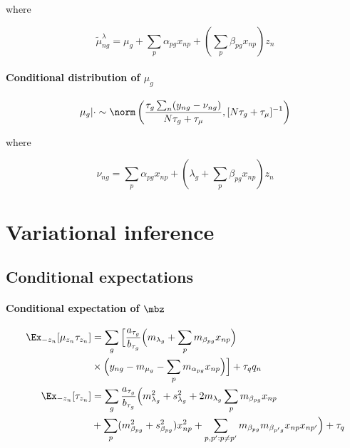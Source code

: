 where

\begin{equation}
\tilde{\mu}^\lambda_{ng} = \mu_g + \sum_p \alpha_{pg} x_{np} + \left( \sum_p \beta_{pg} x_{np} \right) z_n
\end{equation}

\paragraph{Conditional distribution of $\mu_g$}

\begin{equation}
\mu_g | \cdot \sim \norm\left(
\frac{\tau_g \sum_n(y_{ng} - \nu_{ng})}{N \tau_g + \tau_\mu}, [N \tau_g + \tau_\mu]^{-1}
\right)
\end{equation}

where

\begin{equation}
\nu_{ng} = \sum_p \alpha_{pg} x_{np} + \left( \lambda_g + \sum_p \beta_{pg} x_{np} \right) z_n
\end{equation}



\section{Variational inference} \label{app:clvm_vi}

\subsection{Conditional expectations}


\paragraph{Conditional expectation of $\mbz$}

\begin{equation}
\begin{aligned}
\Ex_{-z_n}[\mu_{z_n}\tau_{z_n}] & = \sum_g \Big[ \frac{a_{\tau_g}}{b_{\tau_g}}
\Big( m_{\lambda_g} + \sum_p m_{\beta_{pg}} x_{np} \Big) \\
& \times \Big( y_{ng} - m_{\mu_g} - \sum_p m_{\alpha_{pg}} x_{np} \Big)
\Big] + \tau_q q_n \\
\Ex_{-z_n} [\tau_{z_n}] & = \sum_g \frac{a_{\tau_g}}{b_{\tau_g}}
 \Big(m_{\lambda_g}^2 + s_{\lambda_g}^2 + 2m_{\lambda_g} \sum_p m_{\beta_{pg}} x_{np} \\
 & + \sum_p (m_{\beta_{pg}}^2 + s_{\beta_{pg}}^2) x_{np}^2 +
 \sum_{p,p': p \neq p'} m_{\beta_{pg}} m_{\beta_{p'g}} x_{np}x_{np'}
\Big) + \tau_q
\end{aligned}
\end{equation}


